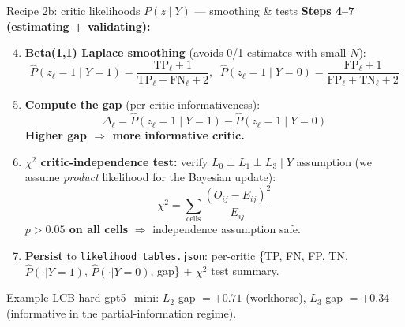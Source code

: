 \documentclass[10pt]{beamer}
\newcommand{\good}[1]{\textcolor{accentGreen}{\textbf{#1}}}
\newcommand{\info}[1]{\textcolor{primaryBlue}{\textbf{#1}}}
\begin{document}
\begin{frame}{Recipe 2b: critic likelihoods \textcolor{accentGreen}{$P(z\mid Y)$} --- smoothing \& tests}
\vspace{0.15cm}
\textbf{Steps 4--7 (estimating + validating):}
\begin{enumerate}\setcounter{enumi}{3}
\item \info{Beta(1,1) Laplace smoothing} (avoids 0/1 estimates with small $N$):
  \[
  \hat{P}(z_\ell{=}1 \mid Y{=}1) = \frac{\mathrm{TP}_\ell + 1}{\mathrm{TP}_\ell + \mathrm{FN}_\ell + 2}, \;\;
  \hat{P}(z_\ell{=}1 \mid Y{=}0) = \frac{\mathrm{FP}_\ell + 1}{\mathrm{FP}_\ell + \mathrm{TN}_\ell + 2}
  \]

\item \info{Compute the gap} (per-critic informativeness):
  \[
  \Delta_\ell = \hat{P}(z_\ell{=}1\mid Y{=}1) - \hat{P}(z_\ell{=}1\mid Y{=}0)
  \]
  \good{Higher gap $\Rightarrow$ more informative critic.}

\item \info{$\chi^2$ critic-independence test:} verify $L_0 \perp L_1 \perp L_3 \mid Y$
  assumption (we assume \emph{product} likelihood for the Bayesian update):
  \[
  \chi^2 = \sum_{\text{cells}} \frac{(O_{ij} - E_{ij})^2}{E_{ij}}
  \]
  \good{$p > 0.05$ on all cells} $\Rightarrow$ independence assumption safe.

\item \info{Persist} to \texttt{likelihood\_tables.json}: per-critic
  \{TP, FN, FP, TN, $\hat{P}(\cdot|Y{=}1)$, $\hat{P}(\cdot|Y{=}0)$, gap\} +
  $\chi^2$ test summary.
\end{enumerate}

\textcolor{softGrey}{\scriptsize Example LCB-hard gpt5\_mini: $L_2$ gap $= +0.71$
(workhorse), $L_3$ gap $= +0.34$ (informative in the partial-information regime).}
\end{frame}
\end{document}
